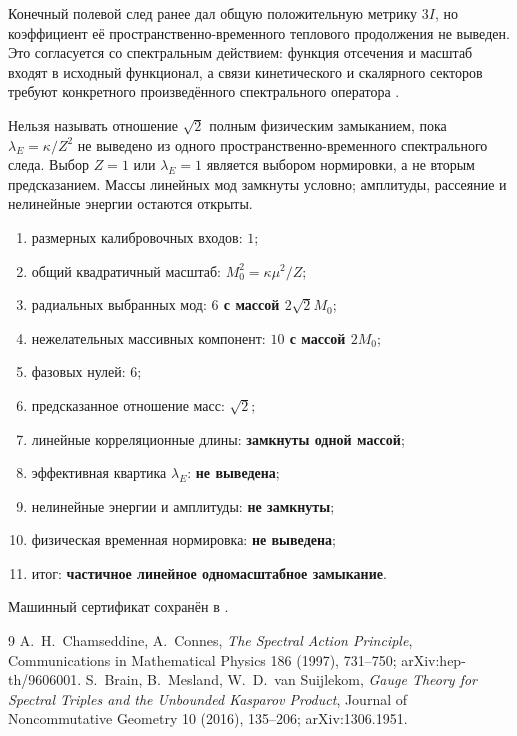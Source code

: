 Конечный полевой след ранее дал общую положительную метрику $3I$, но
коэффициент её пространственно-временного теплового продолжения не выведен.
Это согласуется со спектральным действием: функция отсечения и масштаб входят
в исходный функционал, а связи кинетического и скалярного секторов требуют
конкретного произведённого спектрального оператора
\cite{v7-single-scale-spectral-action,v7-single-scale-product}.

\begin{nogocriterion}
Нельзя называть отношение $\sqrt2$ полным физическим замыканием, пока
$\lambda_E=\kappa/Z^2$ не выведено из одного пространственно-временного
спектрального следа. Выбор $Z=1$ или $\lambda_E=1$ является выбором
нормировки, а не вторым предсказанием. Массы линейных мод замкнуты условно;
амплитуды, рассеяние и нелинейные энергии остаются открыты.
\end{nogocriterion}

\begin{protocol}
\begin{enumerate}
 \item размерных калибровочных входов: \textbf{$1$};
 \item общий квадратичный масштаб: \textbf{$M_0^2=\kappa\mu^2/Z$};
 \item радиальных выбранных мод: \textbf{$6$ с массой $2\sqrt2M_0$};
 \item нежелательных массивных компонент: \textbf{$10$ с массой $2M_0$};
 \item фазовых нулей: \textbf{$6$};
 \item предсказанное отношение масс: \textbf{$\sqrt2$};
 \item линейные корреляционные длины: \textbf{замкнуты одной массой};
 \item эффективная квартика $\lambda_E$: \textbf{не выведена};
 \item нелинейные энергии и амплитуды: \textbf{не замкнуты};
 \item физическая временная нормировка: \textbf{не выведена};
 \item итог: \textbf{частичное линейное одномасштабное замыкание}.
\end{enumerate}
\end{protocol}

Машинный сертификат сохранён в
.

\begin{thebibliography}{9}
A.~H.~Chamseddine, A.~Connes,
\emph{The Spectral Action Principle},
Communications in Mathematical Physics 186 (1997), 731--750;
arXiv:hep-th/9606001.
S.~Brain, B.~Mesland, W.~D.~van Suijlekom,
\emph{Gauge Theory for Spectral Triples and the Unbounded Kasparov Product},
Journal of Noncommutative Geometry 10 (2016), 135--206;
arXiv:1306.1951.
\end{thebibliography}